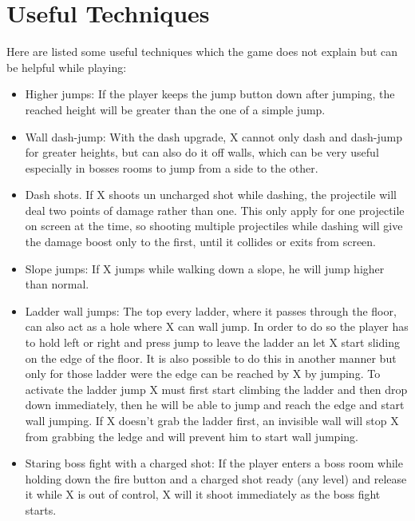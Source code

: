 \section{Useful Techniques}
Here are listed some useful techniques which the game does not explain but can be helpful while playing\cite{RTA_wiki:X1}: %
\begin{itemize}
	\item Higher jumps: If the player keeps the jump button down after jumping, the reached height will be greater than the one of a simple jump.
	
	\item Wall dash-jump: With the dash upgrade, X cannot only dash and dash-jump for greater heights, but can also do it off walls, which can be very useful especially in bosses rooms to jump from a side to the other.
	
	\item Dash shots. If X shoots un uncharged shot while dashing, the projectile will deal two points of damage rather than one. This only apply for one projectile on screen at the time, so shooting multiple projectiles while dashing will give the damage boost only to the first, until it collides or exits from screen.
	
	\item Slope jumps: If X jumps while walking down a slope, he will jump higher than normal.
	
	\item Ladder wall jumps: The top every ladder, where it passes through the floor, can also act as a hole where X can wall jump. In order to do so the player has to hold left or right and press jump to leave the ladder an let X start sliding on the edge of the floor. It is also possible to do this in another manner but only for those ladder were the edge can be reached by X by jumping. To activate the ladder jump X must first start climbing the ladder and then drop down immediately, then he will be able to jump and reach the edge and start wall jumping. If X doesn't grab the ladder first, an invisible wall will stop X from grabbing the ledge and will prevent him to start wall jumping.
	
	\item Staring boss fight with a charged shot: If the player enters a boss room while holding down the fire button and a charged shot ready (any level) and release it while X is out of control, X will it shoot immediately as the boss fight starts.
\end{itemize}

